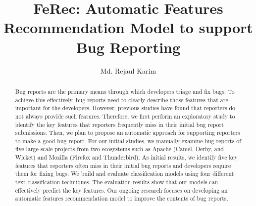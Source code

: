 \documentclass[sigconf,authordraft]{acmart}
\begin{document}
%
\title{FeRec: Automatic Features Recommendation Model  to support Bug Reporting}

%
\author{Md. Rejaul Karim}



%
\renewcommand{\shortauthors}{Md Rejaul Karim, et al.}

%
\begin{abstract}
Bug reports are the primary means through which developers triage and fix bugs. To achieve this effectively, bug reports need to clearly describe those features that are important for the developers. However, previous studies have found that reporters do not always provide such features. Therefore, we first perform an exploratory study to identify the key features that reporters frequently miss in their initial bug report submissions. Then, we plan to propose an automatic approach for supporting reporters to make a good bug report. For our initial studies, we manually examine bug reports of five large-scale projects from two ecosystems such as Apache (Camel, Derby, and Wicket) and Mozilla (Firefox and Thunderbird). As initial results, we identify five key features that reporters often miss in their initial bug reports and developers require them for fixing bugs. We build and evaluate classification models using four different text-classification techniques. The evaluation results show that our models can effectively predict the key features. Our ongoing research focuses on developing an automatic features recommendation model to improve the contents of bug reports. 
\end{abstract}
\end{document}
